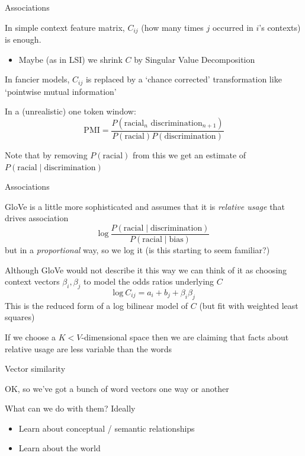\documentclass{hertieteaching}
\begin{document}
\begin{frame}{Associations}

In simple context feature matrix, $C_{ij}$ (how many times $j$ occurred in $i$'s contexts) is enough. 
\begin{itemize}
  \item Maybe (as in LSI) we shrink $C$ by Singular Value Decomposition
\end{itemize}

In fancier models, $C_{ij}$ is replaced by a `chance corrected' transformation like `pointwise mutual information'

In a (unrealistic) one token window:
$$
\text{PMI} = \frac{P(\text{racial}_n\text{ discrimination}_{n+1})}
{P(\text{racial}) P(\text{discrimination})}
$$ 

Note that by removing $P(\text{racial})$ from this we get an estimate of $P(\text{racial} \mid \text{discrimination})$


\end{frame}
\begin{frame}{Associations}

\textsf{GloVe} \parencite{Pennington.etal2014} is a little more sophisticated and assumes that it is \textit{relative usage} that drives association
$$
\text{log}~\frac{P(\text{racial} \mid \text{discrimination})}
{P(\text{racial} \mid \text{bias})}
$$
but in a \textit{proportional} way, so we log it (is this starting to seem familiar?)

\pause

Although \textsf{GloVe} would not describe it this way we can think of it as choosing context vectors $\beta_i, \beta_j$ to model the odds ratios underlying $C$
$$
\text{log}~C_{ij} = a_i + b_j + \beta_i \beta_j
$$
This is the reduced form of a log bilinear model of $C$ (but fit with weighted least squares)

If we choose a $K<V$-dimensional space then we are claiming that facts about relative usage are less 
variable than the words

\end{frame}


\begin{frame}[fragile]{Vector similarity}

OK, so we've got a bunch of word vectors one way or another

What can we do with them? Ideally
\begin{itemize}
  \item Learn about conceptual / semantic relationships
  \item Learn about the world
\end{itemize}




\end{frame}
\end{document}
